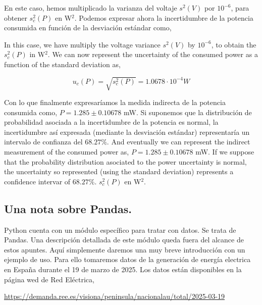 \begin{paracol}{2}
En este caso, hemos multiplicado la varianza del voltaje $s^2(V)$ por $10^{-6}$, para obtener $s_c^2(P)$ en W$^2$. Podemos expresar ahora la incertidumbre de la potencia consumida en función de la desviación estándar como,

\switchcolumn
In this case, we have multiply the voltage variance $s^2(V)$ by $10^{-6}$, to obtain the $s_c^2(P)$ in W$^2$. We can now represent the uncertainty of the consumed power as a function of the standard deviation as,
\end{paracol}
\begin{equation*}
u_c(P) = \sqrt{s_c^2(P)} =  1.0678\cdot 10^{-4} W
\end{equation*}
\begin{paracol}{2}
Con lo que finalmente expresaríamos la medida indirecta de la potencia consumida como, $P = 1.285 \pm 0.10678 $ mW. Si suponemos que la distribución de probabilidad asociada a la incertidumbre de la potencia es normal, la incertidumbre así expresada (mediante la desviación estándar) representaría un intervalo de confianza del $68.27\%$. 
\switchcolumn
And eventually we can represent the indirect measurement of the consumed power as, $P = 1.285 \pm 0.10678 $ mW. If we suppose that the probability distribution asociated to the power uncertainty is normal, the uncertainty so represented (using the standard deviation) represents a confidence intervar of $68.27\%$. $s_c^2(P)$ en W$^2$.
\end{paracol}
\begin{paracol}{2}
\section{Una nota sobre Pandas.}
Python cuenta con un módulo específico para tratar con datos. Se trata de Pandas. Una descripción detallada de este módulo queda fuera del alcance de estos apuntes. Aquí simplemente daremos una muy breve introducción con un ejemplo de uso. Para ello tomaremos datos de la generación de energía electrica en España durante el 19 de marzo de 2025. Los datos están disponibles en la página wed de Red Eléctrica, 
\end{paracol}

\begin{center}
\href{https://demanda.ree.es/visiona/peninsula/nacionalau/total/2025-03-19}{https://demanda.ree.es/visiona/peninsula/nacionalau/total/2025-03-19}
\end{center}

